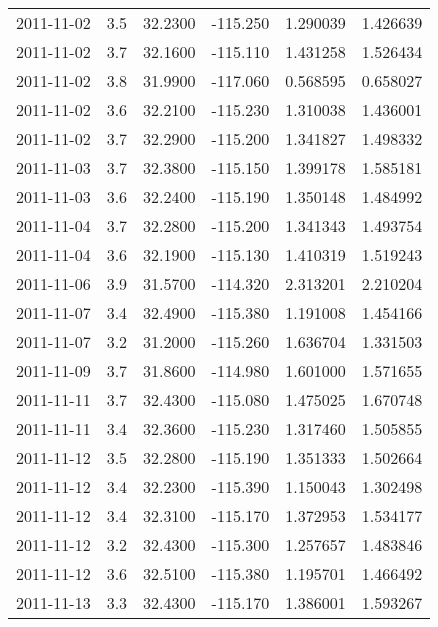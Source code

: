 \begin{tabular}{lrrrrr}
2011-11-02 &       3.5 &  32.2300 &  -115.250 &         1.290039 &         1.426639 \\
2011-11-02 &       3.7 &  32.1600 &  -115.110 &         1.431258 &         1.526434 \\
2011-11-02 &       3.8 &  31.9900 &  -117.060 &         0.568595 &         0.658027 \\
2011-11-02 &       3.6 &  32.2100 &  -115.230 &         1.310038 &         1.436001 \\
2011-11-02 &       3.7 &  32.2900 &  -115.200 &         1.341827 &         1.498332 \\
2011-11-03 &       3.7 &  32.3800 &  -115.150 &         1.399178 &         1.585181 \\
2011-11-03 &       3.6 &  32.2400 &  -115.190 &         1.350148 &         1.484992 \\
2011-11-04 &       3.7 &  32.2800 &  -115.200 &         1.341343 &         1.493754 \\
2011-11-04 &       3.6 &  32.1900 &  -115.130 &         1.410319 &         1.519243 \\
2011-11-06 &       3.9 &  31.5700 &  -114.320 &         2.313201 &         2.210204 \\
2011-11-07 &       3.4 &  32.4900 &  -115.380 &         1.191008 &         1.454166 \\
2011-11-07 &       3.2 &  31.2000 &  -115.260 &         1.636704 &         1.331503 \\
2011-11-09 &       3.7 &  31.8600 &  -114.980 &         1.601000 &         1.571655 \\
2011-11-11 &       3.7 &  32.4300 &  -115.080 &         1.475025 &         1.670748 \\
2011-11-11 &       3.4 &  32.3600 &  -115.230 &         1.317460 &         1.505855 \\
2011-11-12 &       3.5 &  32.2800 &  -115.190 &         1.351333 &         1.502664 \\
2011-11-12 &       3.4 &  32.2300 &  -115.390 &         1.150043 &         1.302498 \\
2011-11-12 &       3.4 &  32.3100 &  -115.170 &         1.372953 &         1.534177 \\
2011-11-12 &       3.2 &  32.4300 &  -115.300 &         1.257657 &         1.483846 \\
2011-11-12 &       3.6 &  32.5100 &  -115.380 &         1.195701 &         1.466492 \\
2011-11-13 &       3.3 &  32.4300 &  -115.170 &         1.386001 &         1.593267 \\

\end{tabular}
